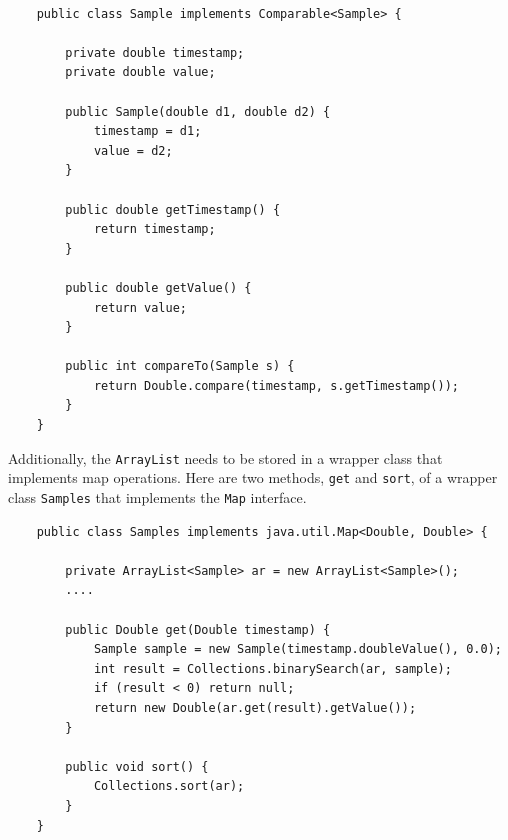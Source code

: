 \documentclass{book}
\theoremstyle{definition}
\begin{document}
\ttfamily
\begin{verbatim}
   
    public class Sample implements Comparable<Sample> {

        private double timestamp;
        private double value;
	
        public Sample(double d1, double d2) {
            timestamp = d1;
            value = d2;
        }
	
        public double getTimestamp() {
            return timestamp;
        }
	
        public double getValue() {
            return value;
        }
	      
        public int compareTo(Sample s) {
            return Double.compare(timestamp, s.getTimestamp());	
        }
    }

\end{verbatim}
\normalfont
Additionally, the \texttt{ArrayList} needs to be stored in a wrapper class that implements map operations. Here are two methods, \texttt{get} and \texttt{sort}, of a wrapper class \texttt{Samples} that implements the \texttt{Map} interface. 
\ttfamily
\begin{verbatim}
    public class Samples implements java.util.Map<Double, Double> {

        private ArrayList<Sample> ar = new ArrayList<Sample>();
        ....
		
        public Double get(Double timestamp) {
            Sample sample = new Sample(timestamp.doubleValue(), 0.0);
            int result = Collections.binarySearch(ar, sample);
            if (result < 0) return null;
            return new Double(ar.get(result).getValue());
        }
		
        public void sort() {
            Collections.sort(ar);	
        }
    }
    
\end{verbatim}
\normalfont 
  
\end{document}
